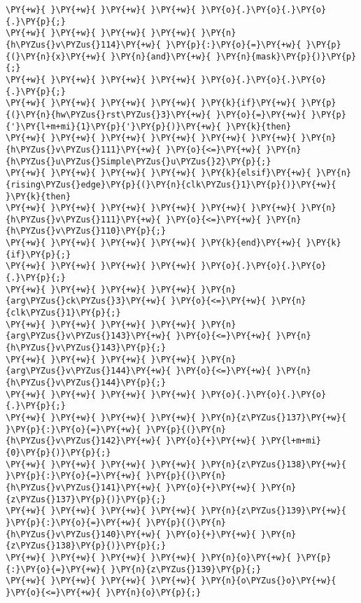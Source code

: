 \begin{Verbatim}[commandchars=\\\{\}]
\PY{+w}{ }\PY{+w}{ }\PY{+w}{ }\PY{+w}{ }\PY{o}{.}\PY{o}{.}\PY{o}{.}\PY{p}{;}
\PY{+w}{ }\PY{+w}{ }\PY{+w}{ }\PY{+w}{ }\PY{n}{h\PYZus{}v\PYZus{}114}\PY{+w}{ }\PY{p}{:}\PY{o}{=}\PY{+w}{ }\PY{p}{(}\PY{n}{x}\PY{+w}{ }\PY{n}{and}\PY{+w}{ }\PY{n}{mask}\PY{p}{)}\PY{p}{;}
\PY{+w}{ }\PY{+w}{ }\PY{+w}{ }\PY{+w}{ }\PY{o}{.}\PY{o}{.}\PY{o}{.}\PY{p}{;}
\PY{+w}{ }\PY{+w}{ }\PY{+w}{ }\PY{+w}{ }\PY{k}{if}\PY{+w}{ }\PY{p}{(}\PY{n}{hw\PYZus{}rst\PYZus{}3}\PY{+w}{ }\PY{o}{=}\PY{+w}{ }\PY{p}{'}\PY{l+m+mi}{1}\PY{p}{'}\PY{p}{)}\PY{+w}{ }\PY{k}{then}
\PY{+w}{ }\PY{+w}{ }\PY{+w}{ }\PY{+w}{ }\PY{+w}{ }\PY{+w}{ }\PY{n}{h\PYZus{}v\PYZus{}111}\PY{+w}{ }\PY{o}{<=}\PY{+w}{ }\PY{n}{h\PYZus{}u\PYZus{}Simple\PYZus{}u\PYZus{}2}\PY{p}{;}
\PY{+w}{ }\PY{+w}{ }\PY{+w}{ }\PY{+w}{ }\PY{k}{elsif}\PY{+w}{ }\PY{n}{rising\PYZus{}edge}\PY{p}{(}\PY{n}{clk\PYZus{}1}\PY{p}{)}\PY{+w}{ }\PY{k}{then}
\PY{+w}{ }\PY{+w}{ }\PY{+w}{ }\PY{+w}{ }\PY{+w}{ }\PY{+w}{ }\PY{n}{h\PYZus{}v\PYZus{}111}\PY{+w}{ }\PY{o}{<=}\PY{+w}{ }\PY{n}{h\PYZus{}v\PYZus{}110}\PY{p}{;}
\PY{+w}{ }\PY{+w}{ }\PY{+w}{ }\PY{+w}{ }\PY{k}{end}\PY{+w}{ }\PY{k}{if}\PY{p}{;}
\PY{+w}{ }\PY{+w}{ }\PY{+w}{ }\PY{+w}{ }\PY{o}{.}\PY{o}{.}\PY{o}{.}\PY{p}{;}
\PY{+w}{ }\PY{+w}{ }\PY{+w}{ }\PY{+w}{ }\PY{n}{arg\PYZus{}ck\PYZus{}3}\PY{+w}{ }\PY{o}{<=}\PY{+w}{ }\PY{n}{clk\PYZus{}1}\PY{p}{;}
\PY{+w}{ }\PY{+w}{ }\PY{+w}{ }\PY{+w}{ }\PY{n}{arg\PYZus{}v\PYZus{}143}\PY{+w}{ }\PY{o}{<=}\PY{+w}{ }\PY{n}{h\PYZus{}v\PYZus{}143}\PY{p}{;}
\PY{+w}{ }\PY{+w}{ }\PY{+w}{ }\PY{+w}{ }\PY{n}{arg\PYZus{}v\PYZus{}144}\PY{+w}{ }\PY{o}{<=}\PY{+w}{ }\PY{n}{h\PYZus{}v\PYZus{}144}\PY{p}{;}
\PY{+w}{ }\PY{+w}{ }\PY{+w}{ }\PY{+w}{ }\PY{o}{.}\PY{o}{.}\PY{o}{.}\PY{p}{;}
\PY{+w}{ }\PY{+w}{ }\PY{+w}{ }\PY{+w}{ }\PY{n}{z\PYZus{}137}\PY{+w}{ }\PY{p}{:}\PY{o}{=}\PY{+w}{ }\PY{p}{(}\PY{n}{h\PYZus{}v\PYZus{}142}\PY{+w}{ }\PY{o}{+}\PY{+w}{ }\PY{l+m+mi}{0}\PY{p}{)}\PY{p}{;}
\PY{+w}{ }\PY{+w}{ }\PY{+w}{ }\PY{+w}{ }\PY{n}{z\PYZus{}138}\PY{+w}{ }\PY{p}{:}\PY{o}{=}\PY{+w}{ }\PY{p}{(}\PY{n}{h\PYZus{}v\PYZus{}141}\PY{+w}{ }\PY{o}{+}\PY{+w}{ }\PY{n}{z\PYZus{}137}\PY{p}{)}\PY{p}{;}
\PY{+w}{ }\PY{+w}{ }\PY{+w}{ }\PY{+w}{ }\PY{n}{z\PYZus{}139}\PY{+w}{ }\PY{p}{:}\PY{o}{=}\PY{+w}{ }\PY{p}{(}\PY{n}{h\PYZus{}v\PYZus{}140}\PY{+w}{ }\PY{o}{+}\PY{+w}{ }\PY{n}{z\PYZus{}138}\PY{p}{)}\PY{p}{;}
\PY{+w}{ }\PY{+w}{ }\PY{+w}{ }\PY{+w}{ }\PY{n}{o}\PY{+w}{ }\PY{p}{:}\PY{o}{=}\PY{+w}{ }\PY{n}{z\PYZus{}139}\PY{p}{;}
\PY{+w}{ }\PY{+w}{ }\PY{+w}{ }\PY{+w}{ }\PY{n}{o\PYZus{}o}\PY{+w}{ }\PY{o}{<=}\PY{+w}{ }\PY{n}{o}\PY{p}{;}

\end{Verbatim}
